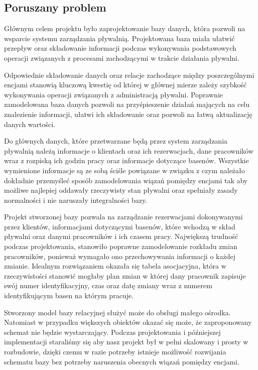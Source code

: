 \documentclass[a4paper]{article}
\begin{document}
\subsection{Poruszany problem}

Głównym celem projektu było zaprojektowanie bazy danych, która pozwoli na wsparcie systemu zarządzania pływalnią. Projektowana baza miała ułatwić przepływ oraz składowanie informacji podczas wykonywania podstawowych operacji związanych z procesami zachodzącymi w trakcie działania pływalni.

Odpowiednie składowanie danych oraz relacje zachodzące między poszczególnymi encjami stanowią kluczową kwestię od której w głównej mierze zależy szybkość wykonywania operacji związanych z administracją pływalni. Poprawnie zamodelowana baza danych pozwoli na przyśpieszenie działań mających na celu znalezienie informacji, ułatwi ich składowanie oraz pozwoli na łatwą aktualizację danych wartości.

Do głównych danych, które przetwarzane będą przez system zarządzania pływalnią należą informacje o klientach oraz ich rezerwacjach, dane pracowników wraz z rozpiską ich godzin pracy oraz informacje dotyczące basenów. Wszystkie wymienione informacje są ze sobą ściśle powiązane w związku z czym należało dokładnie przemyśleć sposób zamodelowania wiązań pomiędzy encjami tak aby możliwe najlepiej oddawały rzeczywisty stan pływalni oraz spełniały zasady normalności i nie naruszały integralności bazy.

Projekt stworzonej bazy pozwala na zarządzanie rezerwacjami dokonywanymi przez klientów, informacjami dotyczącymi basenów, które wchodzą w skład pływalni oraz danymi pracowników i ich czasem pracy. Największą trudność podczas projektowania, stanowiło poprawne zamodelowanie rozkładu zmian pracowników, ponieważ wymagało ono przechowywania informacji o każdej zmianie. Idealnym rozwiązaniem okazała się tabela asocjacyjna, która w rzeczywistości stanowić mogłaby plan zmian w której dany pracownik zapisuje swój numer identyfikacyjny, czas oraz datę zmiany wraz z numerem identyfikującym basen na którym pracuje.

Stworzony model bazy relacyjnej służyć może do obsługi małego ośrodka. Natomiast w przypadku większych obiektów okazać się może, że zaproponowany schemat nie będzie wystarczający. Podczas projektowania i późniejszej implementacji staraliśmy się aby nasz projekt był w pełni skalowany i prosty w rozbudowie, dzięki czemu w razie potrzeby istnieje możliwość rozwijania schematu bazy bez potrzeby naruszenia obecnych wiązań pomiędzy encjami.
\end{document}
